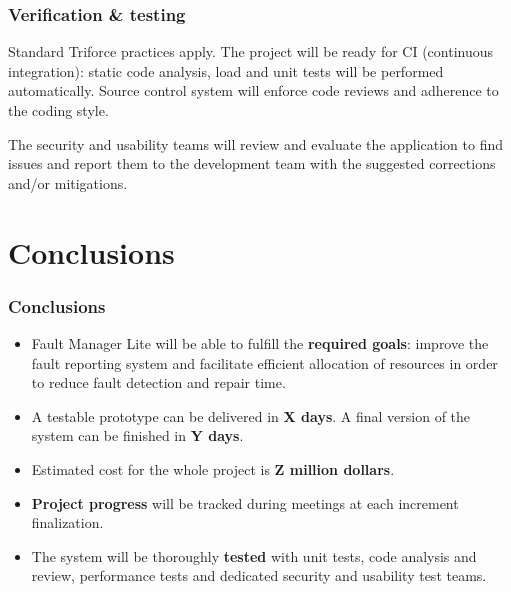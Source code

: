 \documentclass[10pt, compress,usetitleprogressbar,aspectratio=1610]{beamer}
\begin{document}
\begin{frame}
\frametitle{Verification \& testing}
Standard Triforce practices apply. The project will be ready for CI (continuous integration): static code analysis, load and unit tests will be performed automatically. Source control system will enforce code reviews and adherence to the coding style.

The security and usability teams will review and evaluate the application to find issues and report them to the development team with the suggested corrections and/or mitigations.
\end{frame}

\section{Conclusions}

\begin{frame}
\frametitle{Conclusions}

\begin{itemize}
\item Fault Manager Lite will be able to fulfill the \textbf{required goals}: improve the fault reporting system and facilitate efficient allocation of resources in order to reduce fault detection and repair time.
\item A testable prototype can be delivered in \textbf{X days}. A final version of the system can be finished in \textbf{Y days}.
\item Estimated cost for the whole project is \textbf{Z million dollars}.
\item \textbf{Project progress} will be tracked during meetings at each increment finalization.
\item The system will be thoroughly \textbf{tested} with unit tests, code analysis and review, performance tests and dedicated security and usability test teams.
\end{itemize}

\end{frame}

\end{document}
